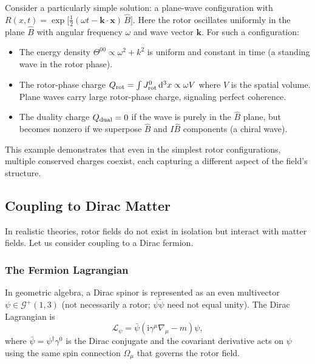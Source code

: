 \documentclass[11pt,a4paper]{article}
\numberwithin{equation}{section}
\theoremstyle{plain}
\theoremstyle{definition}
\theoremstyle{remark}
\newcommand{\dd}{\mathrm{d}}
\newcommand{\ii}{\mathrm{i}}
\begin{document}
Consider a particularly simple solution: a plane-wave configuration with $R(x,t) = \exp\big[\frac{1}{2}(\omega t - \mathbf{k}\cdot\mathbf{x})\,\hat{B}\big]$. Here the rotor oscillates uniformly in the plane $\hat{B}$ with angular frequency $\omega$ and wave vector $\mathbf{k}$. For such a configuration:

\begin{itemize}
  \item The energy density $\Theta^{00} \propto \omega^2 + k^2$ is uniform and constant in time (a standing wave in the rotor phase).
  \item The rotor-phase charge $Q_{\rm rot} = \int J^0_{\rm rot}\,\dd^3x \propto \omega V$ where $V$ is the spatial volume. Plane waves carry large rotor-phase charge, signaling perfect coherence.
  \item The duality charge $Q_{\rm dual} = 0$ if the wave is purely in the $\hat{B}$ plane, but becomes nonzero if we superpose $\hat{B}$ and $I\hat{B}$ components (a chiral wave).
\end{itemize}

This example demonstrates that even in the simplest rotor configurations, multiple conserved charges coexist, each capturing a different aspect of the field's structure.

\subsection{Coupling to Dirac Matter}

In realistic theories, rotor fields do not exist in isolation but interact with matter fields. Let us consider coupling to a Dirac fermion.

\subsubsection{The Fermion Lagrangian}

In geometric algebra, a Dirac spinor is represented as an even multivector $\psi \in \mathcal{G}^+(1,3)$ (not necessarily a rotor; $\psi\widetilde{\psi}$ need not equal unity). The Dirac Lagrangian is
\begin{equation}
\mathcal{L}_\psi = \bar{\psi}(\ii\gamma^\mu\nabla_\mu - m)\psi,
\end{equation}
where $\bar{\psi} = \psi^\dagger\gamma^0$ is the Dirac conjugate and the covariant derivative acts on $\psi$ using the same spin connection $\Omega_\mu$ that governs the rotor field.
\end{document}
